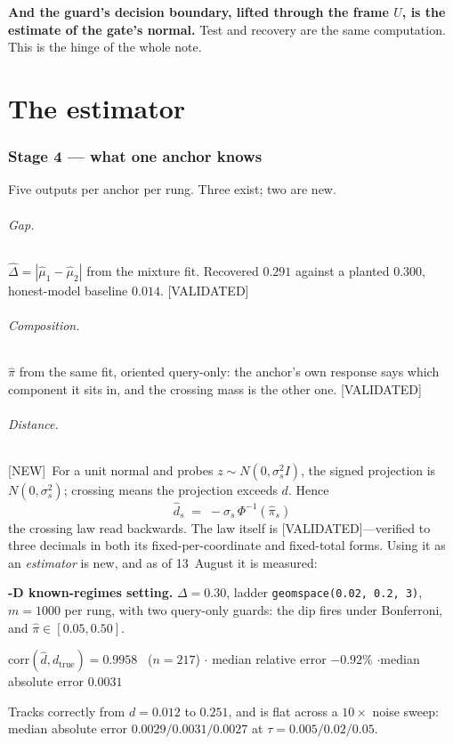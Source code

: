 \documentclass[11pt]{article}
\newcommand{\dhat}{\hat{d}}
\newcommand{\pihat}{\hat{\pi}}
\newcommand{\Dhat}{\hat{\Delta}}
\newcommand{\provtag}[2]{{\footnotesize\sffamily\textcolor{#1}{[#2]}}}
\newcommand{\VALID}{\provtag{okgreen}{VALIDATED}}
\newcommand{\NEWT}{\provtag{newmag}{NEW}}
\begin{document}
\begin{claimbox}
\noindent\textbf{And the guard's decision boundary, lifted through the frame $U$, is the estimate
of the gate's normal.} Test and recovery are the same computation. This is the hinge of the whole
note.
\end{claimbox}

\part{The estimator}

\section{Stage 4 --- what one anchor knows}
\label{sec:stage4}

Five outputs per anchor per rung. Three exist; two are new.

\paragraph{Gap.} $\Dhat = |\hat\mu_1 - \hat\mu_2|$ from the mixture fit. Recovered $0.291$
against a planted $0.300$, honest-model baseline $0.014$. \VALID

\paragraph{Composition.} $\pihat$ from the same fit, oriented query-only: the anchor's own
response says which component it sits in, and the crossing mass is the other one. \VALID

\paragraph{Distance.} \NEWT\ For a unit normal and probes $z \sim N(0,\sigma_s^2 I)$, the signed
projection is $N(0,\sigma_s^2)$; crossing means the projection exceeds $d$. Hence
\[
  \boxed{\;\dhat_s \;=\; -\sigma_s\,\Phi^{-1}(\pihat_s)\;}
\]
the crossing law read backwards. The law itself is \VALID---verified to three decimals in both its
fixed-per-coordinate and fixed-total forms. Using it as an \emph{estimator} is new, and as of
13~August it is measured:

\begin{resultbox}
\noindent\textbf{-D known-regimes setting.} $\Delta = 0.30$, ladder
\texttt{geomspace(0.02, 0.2, 3)}, $m = 1000$ per rung, with two query-only guards: the dip fires
under Bonferroni, and $\pihat \in [0.05, 0.50]$.

\smallskip
\noindent $\mathrm{corr}(\dhat, d_{\text{true}}) = \mathbf{0.9958}$ \, ($n = 217$) \quad$\cdot$\quad
median relative error $\mathbf{-0.92\%}$ \quad$\cdot$\quad median absolute error $0.0031$

\smallskip
\noindent Tracks correctly from $d = 0.012$ to $0.251$, and is flat across a $10\times$ noise
sweep: median absolute error $0.0029 / 0.0031 / 0.0027$ at $\tau = 0.005 / 0.02 / 0.05$.
\end{resultbox}
\end{document}
